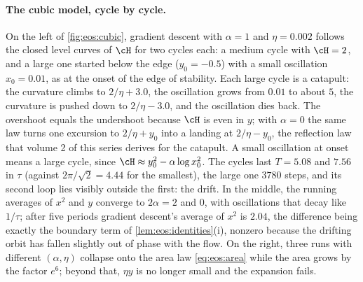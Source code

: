 \begin{refsection}
\paragraph{The cubic model, cycle by cycle.} On the left of \cref{fig:eos:cubic}, gradient descent with $\alpha=1$ and $\eta=0.002$ follows the closed level curves of $\cH$ for two cycles each: a medium cycle with $\cH=2$, and a large one started below the edge ($y_0=-0.5$) with a small oscillation $x_0=0.01$, as at the onset of the edge of stability. Each large cycle is a catapult: the curvature climbs to $2/\eta+3.0$, the oscillation grows from $0.01$ to about $5$, the curvature is pushed down to $2/\eta-3.0$, and the oscillation dies back. The overshoot equals the undershoot because $\cH$ is even in $y$; with $\alpha=0$ the same law turns one excursion to $2/\eta+y_0$ into a landing at $2/\eta-y_0$, the reflection law that volume 2 of this series derives for the catapult. A small oscillation at onset means a large cycle, since $\cH\approx y_0^2-\alpha\log x_0^2$. The cycles last $T=5.08$ and $7.56$ in $\tau$ (against $2\pi/\sqrt2=4.44$ for the smallest), the large one $3780$ steps, and its second loop lies visibly outside the first: the drift. In the middle, the running averages of $x^2$ and $y$ converge to $2\alpha=2$ and $0$, with oscillations that decay like $1/\tau$; after five periods gradient descent's average of $x^2$ is $2.04$, the difference being exactly the boundary term of \cref{lem:eos:identities}(i), nonzero because the drifting orbit has fallen slightly out of phase with the flow. On the right, three runs with different $(\alpha,\eta)$ collapse onto the area law \eqref{eq:eos:area} while the area grows by the factor $e^6$; beyond that, $\eta y$ is no longer small and the expansion fails.


\end{refsection}
